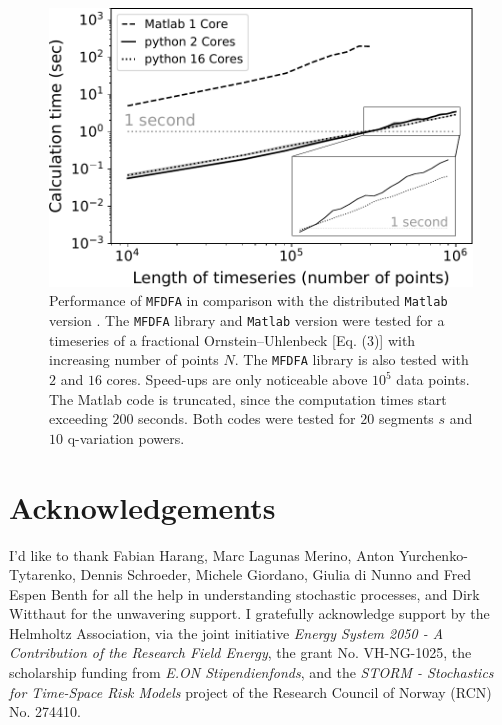 \documentclass[pre, a4paper, aps, floatfix, superscriptaddress, onecolumn, notitlepage, longbibliography]{revtex4-1} %
\begin{document}
\begin{figure}[h]
  \includegraphics[width = 0.5\linewidth]{fig3.pdf}
  \caption{Performance of \texttt{MFDFA} in comparison with the distributed \texttt{Matlab} version \cite{Ihlen2012}.
  The \texttt{MFDFA} library and \texttt{Matlab} version were tested for a timeseries of a fractional Ornstein--Uhlenbeck [Eq. (3)] with increasing number of points $N$.
  The \texttt{MFDFA} library is also tested with $2$ and $16$ cores.
  Speed-ups are only noticeable above $10^5$ data points.
  The Matlab code is truncated, since the computation times start exceeding $200$ seconds.
  Both codes were tested for $20$ segments $s$ and $10$ q-variation powers.}
\end{figure}


\section*{Acknowledgements}
I'd like to thank Fabian Harang, Marc Lagunas Merino, Anton Yurchenko-Tytarenko, Dennis Schroeder, Michele Giordano, Giulia di Nunno and Fred Espen Benth for all the help in understanding stochastic processes, and Dirk Witthaut for the unwavering support.
I gratefully acknowledge support by the Helmholtz Association, via the joint initiative \textit{Energy System 2050 - A Contribution of the Research Field Energy}, the grant No. VH-NG-1025, the scholarship funding from \textit{E.ON Stipendienfonds}, and the \textit{STORM - Stochastics for Time-Space Risk Models} project of the Research Council of Norway (RCN) No. 274410.


\end{document}
